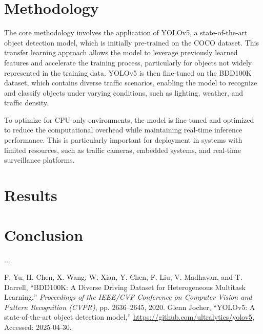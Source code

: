 \documentclass[11pt]{article}  %
\begin{document}
\section{Methodology}
The core methodology involves the application of YOLOv5, a state-of-the-art object detection model, which is initially pre-trained on the COCO dataset. This transfer learning approach allows the model to leverage previously learned features and accelerate the training process, particularly for objects not widely represented in the training data. YOLOv5 is then fine-tuned on the BDD100K dataset, which contains diverse traffic scenarios, enabling the model to recognize and classify objects under varying conditions, such as lighting, weather, and traffic density.

To optimize for CPU-only environments, the model is fine-tuned and optimized to reduce the computational overhead while maintaining real-time inference performance. This is particularly important for deployment in systems with limited resources, such as traffic cameras, embedded systems, and real-time surveillance platforms.

\section{Results}


\section{Conclusion}
...

  
\begin{thebibliography}{9}

F. Yu, H. Chen, X. Wang, W. Xian, Y. Chen, F. Liu, V. Madhavan, and T. Darrell, 
``BDD100K: A Diverse Driving Dataset for Heterogeneous Multitask Learning,'' 
\textit{Proceedings of the IEEE/CVF Conference on Computer Vision and Pattern Recognition (CVPR)}, 
pp. 2636--2645, 2020.
Glenn Jocher, 
``YOLOv5: A state-of-the-art object detection model,''
\url{https://github.com/ultralytics/yolov5}, 
Accessed: 2025-04-30.

\end{thebibliography}
\end{document}
